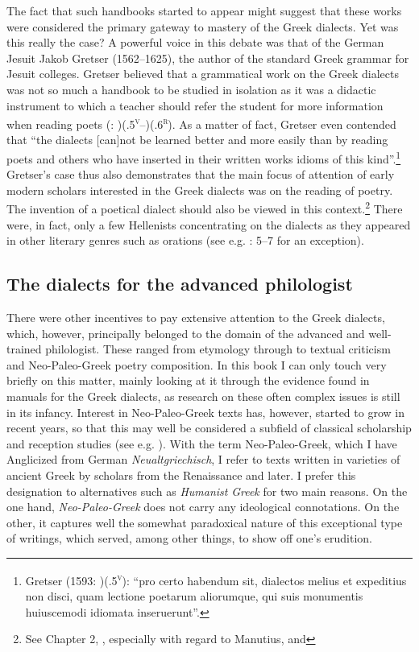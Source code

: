 \documentclass[output=paper]{langsci/langscibook}
\begin{document}
The fact that such handbooks started to appear might suggest that these works were considered the primary gateway to mastery of the Greek dialects. Yet was this really the case? A powerful voice in this debate was that of the German Jesuit Jakob Gretser (1562–1625), the author of the standard Greek grammar for Jesuit colleges. Gretser believed that a grammatical work on the Greek dialects was not so much a handbook to be studied in isolation as it was a didactic instrument to which a teacher should refer the student for more information when reading poets (\citealt{Gretser1593}: )(.5\textsc{\textsuperscript{v}}–)(.6\textsc{\textsuperscript{r}}). As a matter of fact, Gretser even contended that “the dialects [can]not be learned better and more easily than by reading poets and others who have inserted in their written works idioms of this kind”.\footnote{Gretser (1593: )(.5\textsc{\textsuperscript{v}}): “pro certo habendum sit, dialectos melius et expeditius non disci, quam lectione poetarum aliorumque, qui suis monumentis huiuscemodi idiomata inseruerunt”.} Gretser’s case thus also demonstrates that the main focus of attention of early modern scholars interested in the Greek dialects was on the reading of poetry. The invention of a poetical dialect should also be viewed in this context.\footnote{See Chapter 2, , especially with regard to Manutius, and } There were, in fact, only a few Hellenists concentrating on the dialects as they appeared in other literary genres such as orations (see e.g. \citealt{Labbe1639}: 5–7 for an exception).

\subsection{The dialects for the advanced philologist}
\hypertarget{Toc19704820}{}
There were other incentives to pay extensive attention to the Greek dialects, which, however, principally belonged to the domain of the advanced and well-trained philologist. These ranged from etymology through to textual criticism and Neo-Paleo-Greek poetry composition. In this book I can only touch very briefly on this matter, mainly looking at it through the evidence found in manuals for the Greek dialects, as research on these often complex issues is still in its infancy. Interest in Neo-Paleo-Greek texts has, however, started to grow in recent years, so that this may well be considered a subfield of classical scholarship and reception studies (see e.g. \citealt{PällVolt2018}). With the term Neo-Paleo-Greek, which I have Anglicized from German \textit{Neualtgriechisch}, I refer to texts written in varieties of ancient Greek by scholars from the Renaissance and later. I prefer this designation to alternatives such as \textit{Humanist} \textit{Greek} for two main reasons. On the one hand, \textit{Neo-Paleo-Greek} does not carry any ideological connotations. On the other, it captures well the somewhat paradoxical nature of this exceptional type of writings, which served, among other things, to show off one’s erudition.
\end{document}
